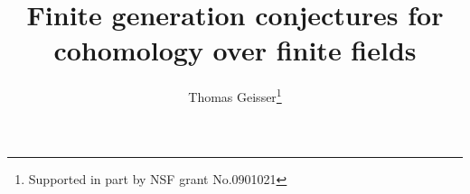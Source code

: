 \documentclass[nospthms,envcountsect]{svmult} %
\begin{document}
\renewcommand{\labelenumi}{\alph{enumi})}
\newcommand{\chr}{\operatorname{char}}
\newcommand{\isom}{\stackrel{\sim}{\longrightarrow}}
\newcommand{\Aut}{\operatorname{Aut}}
\newcommand{\Hom}{\operatorname{Hom}}
\newcommand{\End}{\operatorname{End}}
\newcommand{\HOM}{\operatorname{{\mathcal H{\frak{om}}}}}
\newcommand{\EXT}{\operatorname{\mathcal E{\frak xt}}}
\newcommand{\Tot}{\operatorname{Tot}}
\newcommand{\Ext}{\operatorname{Ext}}
\newcommand{\Gal}{\operatorname{Gal}}
\newcommand{\Pic}{\operatorname{Pic}}
\newcommand{\Spec}{\operatorname{Spec}}
\newcommand{\trdeg}{\operatorname{trdeg}}
\newcommand{\im}{\operatorname{im}}
\newcommand{\coim}{\operatorname{coim}}
\newcommand{\coker}{\operatorname{coker}}
\newcommand{\gr}{\operatorname{gr}}
\newcommand{\id}{\operatorname{id}}
\newcommand{\Br}{\operatorname{Br}}
\newcommand{\cd}{\operatorname{cd}}
\newcommand{\CH}{CH}
\newcommand{\Alb}{\operatorname{Alb}}
\renewcommand{\lim}{\operatornamewithlimits{lim}}
\newcommand{\colim}{\operatornamewithlimits{colim}}
\newcommand{\rk}{\operatorname{rank}}
\newcommand{\codim}{\operatorname{codim}}
\newcommand{\NS}{\operatorname{NS}}
\newcommand{\mot}{\operatorname{DM^{eff}_-}}
\newcommand{\cone}{{\rm cone}}
\newcommand{\rank}{\operatorname{rank}}
\newcommand{\ord}{{\rm ord}}
\newcommand{\f}{{\cal G}}
\newcommand{\g}{{\cal F}}
\newcommand{\du}{{\cal D}}
\newcommand{\G}{{\mathbb G}}
\newcommand{\N}{{\mathbb N}}
\newcommand{\A}{{\mathbb A}}
\newcommand{\Z}{{{\mathbb Z}}}
\newcommand{\Q}{{{\mathbb Q}}}
\newcommand{\R}{{{\mathbb R}}}
\newcommand{\B}{{\mathbb Z}^c}
\renewcommand{\H}{{{\mathbb H}}}
\renewcommand{\P}{{{\mathbb P}}}
\newcommand{\F}{{{\mathbb F}}}
\newcommand{\m}{{\mathfrak m}}
\newcommand{\Sch}{{\text{\rm Sch}}}
\newcommand{\et}{{\text{\rm et}}}
\newcommand{\Zar}{{\text{\rm Zar}}}
\newcommand{\Nis}{{\mathcal M}}
\newcommand{\tr}{\operatorname{tr}}
\newcommand{\tor}{{\text{\rm tor}}}
\newcommand{\red}{{\text{\rm red}}}
\newcommand{\Div}{\operatorname{Div}}
\newcommand{\Ab}{{\text{\rm Ab}}}
\newcommand{\DD}{{\mathbb Z}^c}
\renewcommand{\div}{\operatorname{div}}
\newcommand{\corank}{\operatorname{corank}}
\renewcommand{\O}{{\cal O}}
\newcommand{\C}{{\mathbb C}}
\newcommand{\p}{{\mathfrak p}}
\newcommand{\proof}{\noindent{\it Proof. }}
\newcommand{\proofend}{\hfill $Q.E.D.$ \\}
\newcommand{\rem}{\noindent {\it Remark. }}
\newcommand{\example}{\noindent {\bf Example. }}
\newcommand{\ar}{{\text{\rm ar}}}
\newcommand{\del}{{\delta}}
\title*{Finite generation conjectures for cohomology over finite fields}
\author{Thomas Geisser\thanks{Supported in part by NSF grant No.0901021}}
\end{document}
